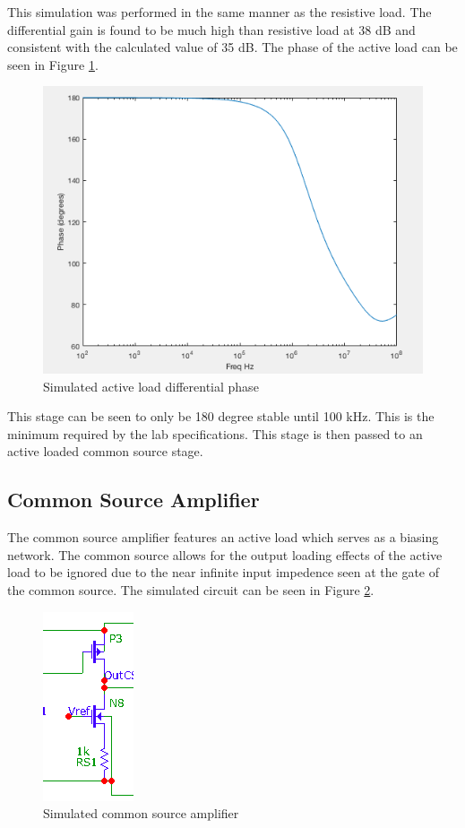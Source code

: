 This simulation was performed in the same manner as the resistive load. The differential gain is found to be much high than resistive load at 38 dB and consistent with the calculated value of 35 dB. The phase of the active load can be seen in Figure \ref{fig:activephase}.
\begin{figure}[H]
	\begin{center}
		\includegraphics[scale=.30]{Simulations/phase_secondstage.png}
		\caption{Simulated active load differential phase}
		\label{fig:activephase}
	\end{center}
\end{figure}
This stage can be seen to only be 180 degree stable until 100 kHz. This is the minimum required by the lab specifications. This stage is then passed to an active loaded common source stage.

\subsection{Common Source Amplifier}

The common source amplifier features an active load which serves as a biasing network. The common source allows for the output loading effects of the active load to be ignored due to the near infinite input impedence seen at the gate of the common source. The simulated circuit can be seen in Figure \ref{fig:simcs}.

\begin{figure}[H]
	\begin{center}
		\includegraphics[scale=.65]{Simulations/simcs.png}
		\caption{Simulated common source amplifier}
		\label{fig:simcs}
	\end{center}
\end{figure} 

